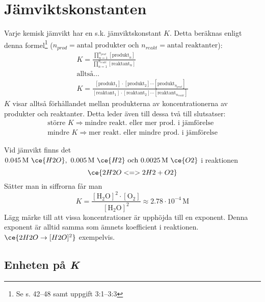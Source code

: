 \section{Jämviktskonstanten}

Varje kemisk jämvikt har en s.k. jämviktskonstant $K$. Detta beräknas enligt denna formel\footnote{Se s. 42--48 samt uppgift 3:1--3:3} ($n_{prod} = \text{antal produkter och } n_{reakt} = \text{antal reaktanter}$):
\begin{gather*}
    K = \frac{\prod_{n=1}^{n_{prod}}[\mathrm{produkt}_n]}{\prod_{n=1}^{n_{reakt}}[\mathrm{reaktant}_n]} \\
    \text{alltså\ldots} \\
    K = \frac{[\mathrm{produkt}_1] \cdot [\mathrm{produkt}_2] \dotsm [\mathrm{produkt}_{n_{prod}}]}{[\mathrm{reaktant}_1] \cdot [\mathrm{reaktant}_2] \dotsm [\mathrm{reaktant}_{n_{reakt}}]}
\end{gather*}
$K$ visar alltså förhållandet mellan produkterna av koncentrationerna av produkter och reaktanter. Detta leder även till dessa två till slutsatser:
\begin{align*}
    \text{större } K \Rightarrow \text{mindre reakt. eller mer prod. i jämförelse} \\
    \text{mindre } K \Rightarrow \text{mer reakt. eller mindre prod. i jämförelse} 
\end{align*}
\pagebreak
\begin{exm}
    Vid jämvikt finns det $ \mathrm{0.045\,M} \ \ce{H2O},\ \mathrm{0.005\,M} \ \ce{H2} \text{ och } \mathrm{0.0025\,M} \ \ce{O2}$ i reaktionen
    \begin{equation*}
        \ce{2H2O <=> 2H2 + O2}
    \end{equation*}
    Sätter man in siffrorna får man
    \begin{equation*}
        K = \frac{\mathrm{[H_2O]^2 \cdot [O_2]}}{\mathrm{[H_2O]^2}} \approx 2.78 \cdot 10^{-4} \, \mathrm{M}
    \end{equation*}
    Lägg märke till att vissa koncentrationer är upphöjda till en exponent. Denna exponent är alltid samma som ämnets koefficient i reaktionen. \\ $\ce{2H2O \rightarrow [H2O]^2}$ exempelvis.
\end{exm}

\subsection{Enheten på \textit{K}}

